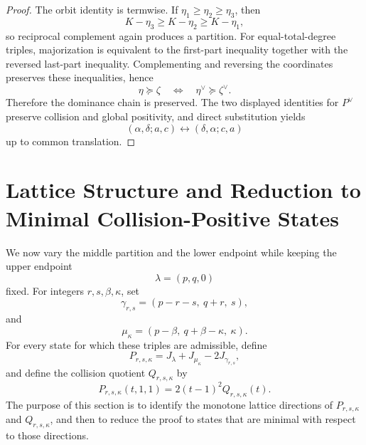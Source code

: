 \documentclass[11pt]{article}
\theoremstyle{definition}
\begin{document}
\begin{proof}
The orbit identity is termwise.  If \(\eta_1\ge\eta_2\ge\eta_3\), then
\begin{equation*}
K-\eta_3\ge K-\eta_2\ge K-\eta_1,
\end{equation*}
so reciprocal complement again produces a partition.  For equal-total-degree triples, majorization is equivalent to the first-part inequality together with the reversed last-part inequality.  Complementing and reversing the coordinates preserves these inequalities, hence
\begin{equation*}
\eta\succcurlyeq\zeta
\quad\Longleftrightarrow\quad
\eta^\vee\succcurlyeq\zeta^\vee.
\end{equation*}
Therefore the dominance chain is preserved.  The two displayed identities for \(P^\vee\) preserve collision and global positivity, and direct substitution yields
\begin{equation*}
(\alpha,\delta;a,c)\longleftrightarrow(\delta,\alpha;c,a)
\end{equation*}
up to common translation.
\end{proof}



\section{Lattice Structure and Reduction to Minimal Collision-Positive States}
\label{sec:monge}

We now vary the middle partition and the lower endpoint while keeping the upper endpoint
\begin{equation*}
\lambda=(p,q,0)
\end{equation*}
fixed.  For integers \(r,s,\beta,\kappa\), set
\begin{equation*}
\gamma_{r,s}
=
(p-r-s,\ q+r,\ s),
\end{equation*}
and
\begin{equation*}
\mu_\kappa
=
(p-\beta,\ q+\beta-\kappa,\ \kappa).
\end{equation*}
For every state for which these triples are admissible, define
\begin{equation*}
P_{r,s,\kappa}
=
J_\lambda+J_{\mu_\kappa}-2J_{\gamma_{r,s}},
\end{equation*}
and define the collision quotient \(Q_{r,s,\kappa}\) by
\begin{equation*}
P_{r,s,\kappa}(t,1,1)
=
2(t-1)^2Q_{r,s,\kappa}(t).
\end{equation*}
The purpose of this section is to identify the monotone lattice directions of
\(P_{r,s,\kappa}\) and \(Q_{r,s,\kappa}\), and then to reduce the proof to states that are minimal with respect to those directions.
\end{document}
